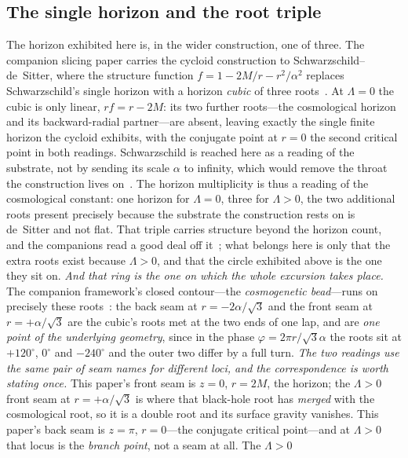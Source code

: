 \documentclass[11pt,a4paper]{article}
\theoremstyle{definition}
\begin{document}
\subsection{The single horizon and the root triple}\label{sec:ring}
The horizon exhibited here is, in the wider construction, one of three. The companion slicing paper carries the cycloid construction to Schwarzschild--de~Sitter, where the structure function $f=1-2M/r-r^2/\alpha^2$ replaces Schwarzschild's single horizon with a horizon \emph{cubic} of three roots~\cite{JanzenSlicing}. At $\Lambda=0$ the cubic is only linear, $rf=r-2M$: its two further roots---the cosmological horizon and its backward-radial partner---are absent, leaving exactly the single finite horizon the cycloid exhibits, with the conjugate point at $r=0$ the second critical point in both readings. Schwarzschild is reached here as a reading of the substrate, not by sending its scale $\alpha$ to infinity, which would remove the throat the construction lives on~\cite{JanzenSlicing}. The horizon multiplicity is thus a reading of the cosmological constant: one horizon for $\Lambda=0$, three for $\Lambda>0$, the two additional roots present precisely because the substrate the construction rests on is de~Sitter and not flat. That triple carries structure beyond the horizon count, and the companions read a good deal off it~\cite{JanzenBoundary,JanzenMatter}; what belongs here is only that the extra roots exist because $\Lambda>0$, and that the circle exhibited above is the one they sit on. \emph{And that ring is the one on which the whole excursion takes place.}
The companion framework's closed contour---the \emph{cosmogenetic bead}---runs on precisely these
roots~\cite{JanzenCRframework}: the back seam at $r=-2\alpha/\sqrt3$ and the front seam at $r=+\alpha/\sqrt3$ are
the cubic's roots met at the two ends of one lap, and are \emph{one point of the underlying geometry}, since in the phase
$\varphi=2\pi r/\sqrt3\alpha$ the roots sit at $+120^\circ$, $0^\circ$ and $-240^\circ$ and the outer two differ
by a full turn. \emph{The two readings use the same pair of seam names for different loci, and the
correspondence is worth stating once.} This paper's front seam is $z=0$, $r=2M$, the horizon; the $\Lambda>0$
front seam at $r=+\alpha/\sqrt3$ is where that black-hole root has \emph{merged} with the cosmological root, so
it is a double root and its surface gravity vanishes. This paper's back seam is $z=\pi$, $r=0$---the conjugate
critical point---and at $\Lambda>0$ that locus is the \emph{branch point}, not a seam at all. The $\Lambda>0$
\end{document}
